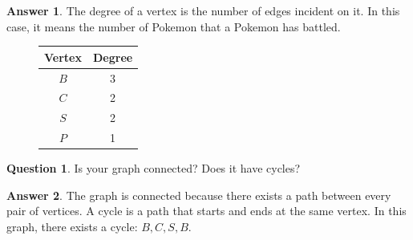 \documentclass[article, 12pt]{article}
\theoremstyle{definition}
\newtheorem{question}{Question}
\newtheorem{answer}{Answer}
\begin{document}
    \begin{answer} The degree of a vertex is the number of edges incident on it. In this case, it means the number of Pokemon that a Pokemon has battled.
        \begin{figure}[H]
            \centering
            \begin{tabular}{|c|c|}
                \hline
                Vertex & Degree \\
                \hline
                $B$ & 3 \\
                $C$ & 2 \\
                $S$ & 2 \\
                $P$ & 1 \\
                \hline
            \end{tabular}
        \end{figure}
    \end{answer}
    \begin{question}
        Is your graph connected? Does it have cycles?
    \end{question}
    \begin{answer}
        The graph is connected because there exists a path between every pair of vertices. A cycle is a path that starts and ends at the same vertex. In this graph, there exists a cycle: $B, C, S, B$.
    \end{answer}
\end{document}
